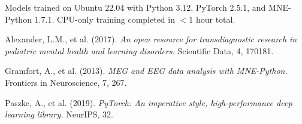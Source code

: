\documentclass[10pt,twocolumn]{article}
\begin{document}
Models trained on Ubuntu 22.04 with Python 3.12, PyTorch 2.5.1, and MNE-Python 1.7.1. CPU-only training completed in $<$1 hour total.

\begin{thebibliography}{9}

Alexander, L.M., et al. (2017). 
\textit{An open resource for transdiagnostic research in pediatric mental health and learning disorders.}
Scientific Data, 4, 170181.

Gramfort, A., et al. (2013).
\textit{MEG and EEG data analysis with MNE-Python.}
Frontiers in Neuroscience, 7, 267.

Paszke, A., et al. (2019).
\textit{PyTorch: An imperative style, high-performance deep learning library.}
NeurIPS, 32.

\end{thebibliography}
\end{document}
